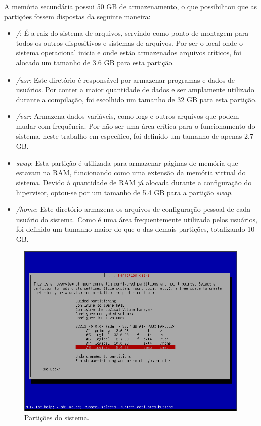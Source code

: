 \documentclass[
	12pt,				%
	oneside,   	        %
	a4paper,			%
	english,			%
	french,				%
	spanish,			%
	brazil,				%
	]{pacotes/abntex2}
\begin{document}
A memória secundária possui 50 GB de armazenamento, o que possibilitou que as partições fossem dispostas da seguinte maneira:

\begin{itemize}
    \item \textit{/}: É a raiz do sistema de arquivos, servindo como ponto de montagem para todos os outros dispositivos e sistemas de arquivos. Por ser o local onde o sistema operacional inicia e onde estão armazenados arquivos críticos, foi alocado um tamanho de 3.6 GB para esta partição.
    
    \item \textit{/usr}: Este diretório é responsável por armazenar programas e dados de usuários. Por conter a maior quantidade de dados e ser amplamente utilizado durante a compilação, foi escolhido um tamanho de 32 GB para esta partição.
    
    \item \textit{/var}: Armazena dados variáveis, como logs e outros arquivos que podem mudar com frequência. Por não ser uma área crítica para o funcionamento do sistema, neste trabalho em específico, foi definido um tamanho de apenas 2.7 GB.
    
    \item \textit{swap}: Esta partição é utilizada para armazenar páginas de memória que estavam na RAM, funcionando como uma extensão da memória virtual do sistema. Devido à quantidade de RAM já alocada durante a configuração do hipervisor, optou-se por um tamanho de 5.4 GB para a partição \textit{swap}.
    
    \item \textit{/home}: Este diretório armazena os arquivos de configuração pessoal de cada usuário do sistema. Como é uma área frequentemente utilizada pelos usuários, foi definido um tamanho maior do que o das demais partições, totalizando 10 GB.
\end{itemize}

\begin{figure}[H]
  \centering
  \includegraphics[scale=0.7]{figuras/partition.png}
  \caption{Partições do sistema.}
  \label{fig:partition}
\end{figure}
\end{document}
